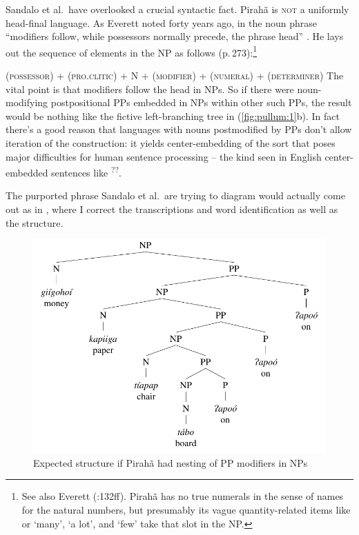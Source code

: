 \documentclass[output=paper,colorlinks,citecolor=brown
]{langscibook}
\begin{document}
Sandalo et al.\ have overlooked a crucial syntactic fact. Pirah{\~a} is
\textsc{not} a uniformly head-final language. As Everett noted forty
years ago, in the noun phrase ``modifiers follow, while possessors normally
precede, the phrase head'' \citep[272]{Everett86HAL}. He lays out
the sequence of elements in the NP as follows (p.\,273):\footnote{%
   See also Everett (\citeyear{Everett83}:132ff). Pirah{\~a} has no true
   numerals in the sense of names for the natural numbers, but presumably
   its vague quantity-related items like  or
    `many',
    `a lot', and
    `few' take that slot in the NP.}

\ea
(\textsc{possessor}) + (\textsc{pro.clitic}) + N + (\textsc{modifier})
+ (\textsc{numeral}) + (\textsc{determiner})
\label{ex:pullum:6}
\z
\medskip\noindent
The vital point is that modifiers follow the head in NPs. So if there
were noun-modifying postpositional PPs embedded in NPs within other
such PPs, the result would be nothing like the fictive left-branching
tree in (\ref{fig:pullum:1}b). In fact there's a good reason that languages with nouns
postmodified by PPs don't allow iteration of the construction: it
yields center-embedding of the sort that poses major difficulties for
human sentence processing -- the kind seen in English center-embedded
sentences like \textsuperscript{??}.

The purported phrase Sandalo et al.\ are trying to diagram would
actually come out as in , where I correct the transcriptions
and word identification as well as the structure.

\begin{figure}
\includegraphics[width=\textwidth]{figures/pullum_figure3.pdf}
\caption{Expected structure if Pirah{\~a} had nesting of PP modifiers in NPs}
\label{fig:pullum:2}
\end{figure}
\end{document}
